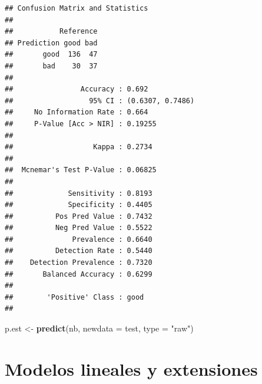 \documentclass[
]{book}
\newenvironment{Shaded}{\begin{snugshade}}{\end{snugshade}}
\newcommand{\DataTypeTok}[1]{\textcolor[rgb]{0.13,0.29,0.53}{#1}}
\newcommand{\KeywordTok}[1]{\textcolor[rgb]{0.13,0.29,0.53}{\textbf{#1}}}
\newcommand{\NormalTok}[1]{#1}
\newcommand{\OperatorTok}[1]{\textcolor[rgb]{0.81,0.36,0.00}{\textbf{#1}}}
\newcommand{\StringTok}[1]{\textcolor[rgb]{0.31,0.60,0.02}{#1}}
\theoremstyle{break}
\theoremstyle{definition}
\theoremstyle{definition}
\theoremstyle{definition}
\theoremstyle{remark}
\begin{document}
\begin{Shaded}
\end{Shaded}

\begin{verbatim}
## Confusion Matrix and Statistics
## 
##           Reference
## Prediction good bad
##       good  136  47
##       bad    30  37
##                                           
##                Accuracy : 0.692           
##                  95% CI : (0.6307, 0.7486)
##     No Information Rate : 0.664           
##     P-Value [Acc > NIR] : 0.19255         
##                                           
##                   Kappa : 0.2734          
##                                           
##  Mcnemar's Test P-Value : 0.06825         
##                                           
##             Sensitivity : 0.8193          
##             Specificity : 0.4405          
##          Pos Pred Value : 0.7432          
##          Neg Pred Value : 0.5522          
##              Prevalence : 0.6640          
##          Detection Rate : 0.5440          
##    Detection Prevalence : 0.7320          
##       Balanced Accuracy : 0.6299          
##                                           
##        'Positive' Class : good            
## 
\end{verbatim}

\begin{Shaded}
\begin{Highlighting}[]
\NormalTok{p.est <-}\StringTok{ }\KeywordTok{predict}\NormalTok{(nb, }\DataTypeTok{newdata =}\NormalTok{ test, }\DataTypeTok{type =} \StringTok{"raw"}\NormalTok{)}
\end{Highlighting}
\end{Shaded}

\hypertarget{modelos-lineales}{%
\chapter{Modelos lineales y extensiones}\label{modelos-lineales}}
\end{document}
